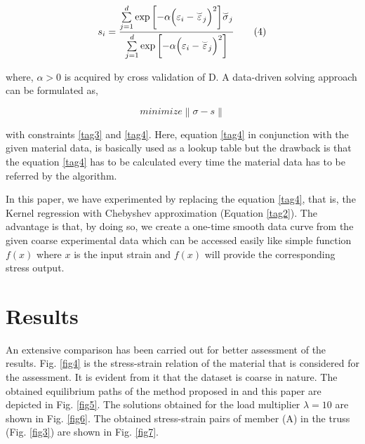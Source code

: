 \documentclass[conference]{IEEEtran}
\begin{document}
\[{s_i} = \frac{{\sum\limits_{j = 1}^d {\exp \left[ { - \alpha {{\left( {{\varepsilon _i} - {{\overset{\lower0.5em\hbox{$\smash{\scriptscriptstyle\smile}$}}{\varepsilon } }_j}} \right)}^2}} \right]} {{\overset{\lower0.5em\hbox{$\smash{\scriptscriptstyle\smile}$}}{\sigma } }_j}}}{{\sum\limits_{j = 1}^d {\exp \left[ { - \alpha {{\left( {{\varepsilon _i} - {{\overset{\lower0.5em\hbox{$\smash{\scriptscriptstyle\smile}$}}{\varepsilon } }_j}} \right)}^2}} \right]} }}\tag{4}\label{tag4}\]

where, $\alpha  > 0$ is acquired by cross validation of D. A data-driven solving approach can be formulated as,

\[minimize\left\| {\sigma  - s} \right\|\tag{5}\label{tag5}\]

with constraints \eqref{tag3} and \eqref{tag4}. Here, equation \eqref{tag4} in conjunction with the given material data, is basically used as a lookup table but the drawback is that the equation \eqref{tag4} has to be calculated every time the material data has to be referred by the algorithm. 

In this paper, we have experimented by replacing the equation \eqref{tag4}, that is, the Kernel regression with Chebyshev approximation (Equation \eqref{tag2}). The advantage is that, by doing so, we create a one-time smooth data curve from the given coarse experimental data which can be accessed easily like simple function $f(x)$ where $x$ is the input strain and $f(x)$ will provide the corresponding stress output. 

\section{Results}
\label{results}
An extensive comparison has been carried out for better assessment of the results. Fig. \ref{fig4} is the stress-strain relation of the material that is considered for the assessment. It is evident from it that the dataset is coarse in nature. The obtained equilibrium paths of the method proposed in \cite{26} and this paper are depicted in Fig. \ref{fig5}. The solutions obtained for the load multiplier $\lambda = 10$ are shown in Fig. \ref{fig6}. The obtained stress-strain pairs of member (A) in the truss (Fig. \ref{fig3}) are shown in Fig. \ref{fig7}.
\end{document}
